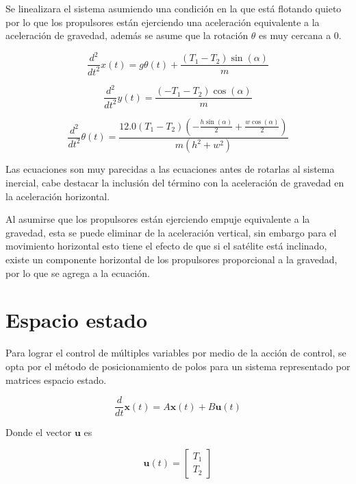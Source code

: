 \documentclass[titlepage, letterpaper]{article}
\begin{document}
Se linealizara el sistema asumiendo una condición en la que está flotando quieto por lo que los propulsores están ejerciendo una aceleración equivalente a la aceleración de gravedad, además se asume que la rotación $\theta$ es muy cercana a 0.

\begin{equation*}\frac{d^{2}}{d t^{2}} x{\left(t \right)} = g \theta{\left(t \right)} + \frac{\left(T_{1} - T_{2}\right) \sin{\left(\alpha \right)}}{m}\end{equation*}

\begin{equation*}\frac{d^{2}}{d t^{2}} y{\left(t \right)} = \frac{\left(- T_{1} - T_{2}\right) \cos{\left(\alpha \right)}}{m}\end{equation*}

\begin{equation*}\frac{d^{2}}{d t^{2}} \theta{\left(t \right)} = \frac{12.0 \left(T_{1} - T_{2}\right) \left(- \frac{h \sin{\left(\alpha \right)}}{2} + \frac{w \cos{\left(\alpha \right)}}{2}\right)}{m \left(h^{2} + w^{2}\right)}\end{equation*}

Las ecuaciones son muy parecidas a las ecuaciones antes de rotarlas al sistema inercial, cabe destacar la inclusión del término con la aceleración de gravedad en la aceleración horizontal.

Al asumirse que los propulsores están ejerciendo empuje equivalente a la gravedad, esta se puede eliminar de la aceleración vertical, sin embargo para el movimiento horizontal esto tiene el efecto de que si el satélite está inclinado, existe un componente horizontal de los propulsores proporcional a la gravedad, por lo que se agrega a la ecuación.

\section{Espacio estado}

Para lograr el control de múltiples variables por medio de la acción de control, se opta por el método de posicionamiento de polos para un sistema representado por matrices espacio estado.

\begin{equation*}
	\frac{d}{d t} \pmb{x}{\left(t \right)}
	= A\pmb{x}(t) + B \pmb{u}(t)
\end{equation*}

Donde el vector $\pmb{u}$ es

\begin{equation*}
	\pmb{u}(t) = \left[\begin{matrix}T_{1}\\T_{2}\end{matrix}\right]
\end{equation*}
\end{document}
